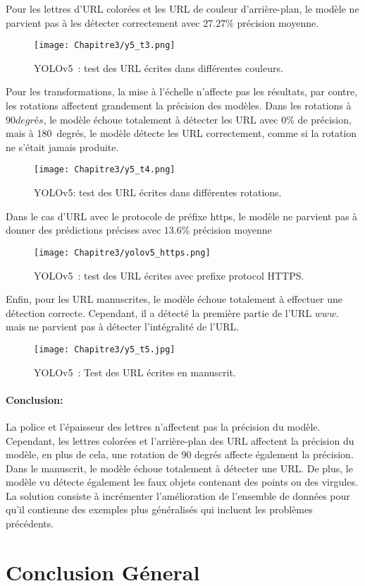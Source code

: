      Pour les lettres d'URL colorées et les URL de couleur d'arrière-plan, le modèle ne parvient pas à les détecter correctement avec $27.27\%$ précision moyenne.
     \begin{figure}[H]
               \centering
               \texttt{[image: Chapitre3/y5\_t3.png]}
               \caption{YOLOv5 : test des URL écrites dans différentes couleurs.}
               \label{y5_t3}
               \end{figure}

     Pour les transformations, la mise à l'échelle n'affecte pas les résultats, par contre, les rotations affectent grandement la précision des modèles. Dans les rotations à $90 degrés$, le modèle échoue totalement à détecter les URL avec $0\%$ de précision, mais à 180 degrés, le modèle détecte les URL correctement, comme si la rotation ne s'était jamais produite.
     \begin{figure}[H]
               \centering
               \texttt{[image: Chapitre3/y5\_t4.png]}
               \caption{YOLOv5: test des URL écrites dans différentes rotations.}
               \label{y5_t4}
               \end{figure}
     
     Dans le cas d'URL avec le protocole de préfixe https, le modèle ne parvient pas à donner des prédictions précises avec $13.6\%$ précision moyenne
     \begin{figure}[H]
               \centering
               \texttt{[image: Chapitre3/yolov5\_https.png]}
               \caption{YOLOv5 : test des URL écrites avec prefixe protocol HTTPS.}
               \label{y5_https}
               \end{figure}
     

     Enfin, pour les URL manuscrites, le modèle échoue totalement à effectuer une détection correcte. Cependant, il a détecté la première partie de l'URL $www.$ mais ne parvient pas à détecter l'intégralité de l'URL.
     \begin{figure}[H]
               \centering
               \texttt{[image: Chapitre3/y5\_t5.jpg]}
               \caption{YOLOv5 : Test des URL écrites en manuscrit.}
               \label{y5_t5}
               \end{figure}

     \paragraph{Conclusion:} La police et l'épaisseur des lettres n'affectent pas la précision du modèle. Cependant, les lettres colorées et l'arrière-plan des URL affectent la précision du modèle, en plus de cela, une rotation de 90 degrés affecte également la précision. Dans le manuscrit, le modèle échoue totalement à détecter une URL. De plus, le modèle vu détecte également les faux objets contenant des points ou des virgules.
     La solution consiste à incrémenter l'amélioration de l'ensemble de données pour qu'il contienne des exemples plus généralisés qui incluent les problèmes précédents.

\section{Conclusion Géneral}